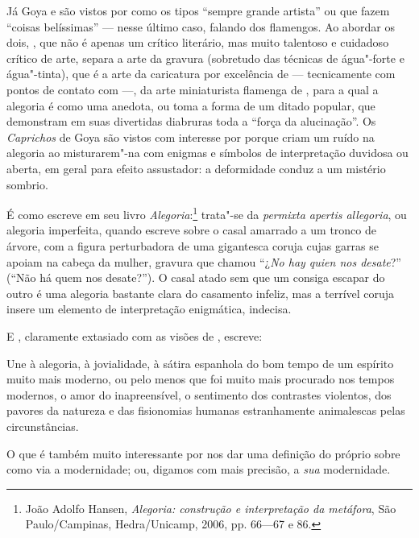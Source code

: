Já Goya e  são vistos por  como os tipos “sempre
grande artista” ou que fazem “coisas belíssimas” --- nesse último caso,
falando dos flamengos. Ao abordar os dois, , que não é apenas
um crítico literário, mas muito talentoso e cuidadoso crítico de arte,
separa a arte da gravura (sobretudo das técnicas de água"-forte e
água"-tinta), que é a arte da caricatura por excelência de  ---
tecnicamente com pontos de contato com  ---, da arte
miniaturista flamenga de , para a qual a alegoria é como uma anedota,
ou toma a forma de um ditado popular, que demonstram em suas divertidas
diabruras toda a “força da alucinação”. Os \textit{Caprichos} de Goya
são vistos com interesse por  porque criam um ruído na
alegoria ao misturarem"-na com enigmas e símbolos de interpretação
duvidosa ou aberta, em geral para efeito assustador: a deformidade
conduz a um mistério sombrio.

É como  escreve em seu livro
\textit{Alegoria}:\footnote{ João Adolfo Hansen, \textit{Alegoria:
construção e interpretação da metáfora}, São Paulo/Campinas,
Hedra/Unicamp, 2006, pp. 66---67 e 86.} trata"-se da
\textit{permixta apertis allegoria}, ou alegoria imperfeita, quando
escreve sobre o casal amarrado a um tronco de árvore, com a figura
perturbadora de uma gigantesca coruja cujas garras se apoiam na cabeça
da mulher, gravura que  chamou “¿\textit{No hay quien nos desate}?”
(``Não há quem nos desate?''). O casal atado sem que um consiga
escapar do outro é uma alegoria bastante clara do casamento infeliz,
mas a terrível coruja insere um elemento de interpretação enigmática,
indecisa.

E , claramente extasiado com as visões de , escreve: 

\begin{hedraquote}
Une à alegoria, à jovialidade, à sátira espanhola do bom tempo de
 um espírito muito mais moderno, ou pelo menos que foi muito
mais procurado nos tempos modernos, o amor do inapreensível, o
sentimento dos contrastes violentos, dos pavores da natureza e das
fisionomias humanas estranhamente animalescas pelas circunstâncias.
\end{hedraquote}

O que é também muito interessante por nos dar uma definição do próprio
 sobre como via a modernidade; ou, digamos com mais precisão,
a \textit{sua} modernidade.

